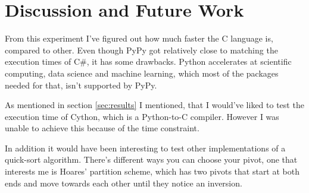 \section*{Discussion and Future Work}

From this experiment I've figured out how much faster the C language is, compared to other. Even though PyPy got relatively close to matching the execution times of C\#, it has some drawbacks. Python accelerates at scientific computing, data science and machine learning, which most of the packages needed for that, isn't supported by PyPy.

\noindent As mentioned in section \ref{sec:results} I mentioned, that I would've liked to test the execution time of Cython, which is a Python-to-C compiler\cite{stack_py_slow}. However I was unable to achieve this because of the time constraint. 

\noindent In addition it would have been interesting to test other implementations of a quick-sort algorithm. There's different ways you can choose your pivot, one that interests me is Hoares' partition scheme, which has two pivots that start at both ends and move towards each other until they notice an inversion.
